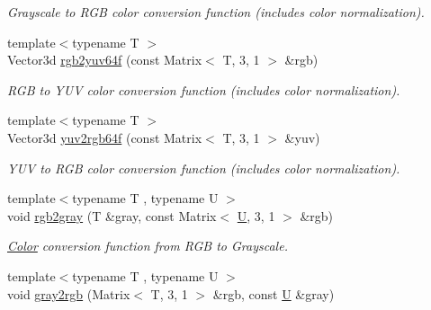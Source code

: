 \begin{DoxyCompactItemize}
\begin{DoxyCompactList}\small\item\em Grayscale to R\-G\-B color conversion function (includes color normalization). \end{DoxyCompactList}\item 
\hypertarget{group___color_conversion_gab873008f62a65b63fea0ff868104b43c}{{\footnotesize template$<$typename T $>$ }\\Vector3d \hyperlink{group___color_conversion_gab873008f62a65b63fea0ff868104b43c}{rgb2yuv64f} (const Matrix$<$ T, 3, 1 $>$ \&rgb)}\label{group___color_conversion_gab873008f62a65b63fea0ff868104b43c}

\begin{DoxyCompactList}\small\item\em R\-G\-B to Y\-U\-V color conversion function (includes color normalization). \end{DoxyCompactList}\item 
\hypertarget{group___color_conversion_ga410f9201d95ba7b01b003cf9636e5011}{{\footnotesize template$<$typename T $>$ }\\Vector3d \hyperlink{group___color_conversion_ga410f9201d95ba7b01b003cf9636e5011}{yuv2rgb64f} (const Matrix$<$ T, 3, 1 $>$ \&yuv)}\label{group___color_conversion_ga410f9201d95ba7b01b003cf9636e5011}

\begin{DoxyCompactList}\small\item\em Y\-U\-V to R\-G\-B color conversion function (includes color normalization). \end{DoxyCompactList}\item 
\hypertarget{group___color_conversion_gaaa9282cb999d6cb7301efd2c69b8f921}{{\footnotesize template$<$typename T , typename U $>$ }\\void \hyperlink{group___color_conversion_gaaa9282cb999d6cb7301efd2c69b8f921}{rgb2gray} (T \&gray, const Matrix$<$ \hyperlink{struct_d_o_1_1_u}{U}, 3, 1 $>$ \&rgb)}\label{group___color_conversion_gaaa9282cb999d6cb7301efd2c69b8f921}

\begin{DoxyCompactList}\small\item\em \hyperlink{class_d_o_1_1_color}{Color} conversion function from R\-G\-B to Grayscale. \end{DoxyCompactList}\item 
\hypertarget{group___color_conversion_gacf7a6109ede1257816c1157b4d0c1fc1}{{\footnotesize template$<$typename T , typename U $>$ }\\void \hyperlink{group___color_conversion_gacf7a6109ede1257816c1157b4d0c1fc1}{gray2rgb} (Matrix$<$ T, 3, 1 $>$ \&rgb, const \hyperlink{struct_d_o_1_1_u}{U} \&gray)}\label{group___color_conversion_gacf7a6109ede1257816c1157b4d0c1fc1}


\end{DoxyCompactItemize}
